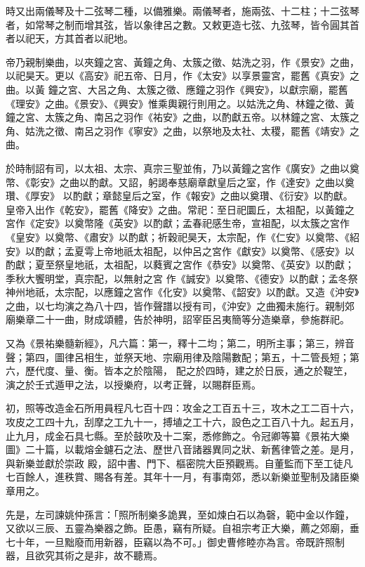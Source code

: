 \begin{pinyinscope}
 時又出兩儀琴及十二弦琴二種，以備雅樂。兩儀琴者，施兩弦、十二柱；十二弦琴者，如常琴之制而增其弦，皆以象律呂之數。又敕更造七弦、九弦琴，皆令圓其首者以祀天，方其首者以祀地。



 帝乃親制樂曲，以夾鐘之宮、黃鐘之角、太簇之徵、姑洗之羽，作《景安》之曲，以祀昊天。更以《高安》祀五帝、日月，作《太安》以享景靈宮，罷舊《真安》之曲。以黃
 鐘之宮、大呂之角、太簇之徵、應鐘之羽作《興安》，以獻宗廟，罷舊《理安》之曲。《景安》、《興安》惟乘輿親行則用之。以姑洗之角、林鐘之徵、黃鐘之宮、太簇之角、南呂之羽作《祐安》之曲，以酌獻五帝。以林鐘之宮、太簇之角、姑洗之徵、南呂之羽作《寧安》之曲，以祭地及太社、太稷，罷舊《靖安》之曲。



 於時制詔有司，以太祖、太宗、真宗三聖並侑，乃以黃鐘之宮作《廣安》之曲以奠幣、《彰安》之曲以酌獻。又詔，躬謁奉慈廟章獻皇后之室，作《達安》之曲以奠瓚、《厚安》
 以酌獻；章懿皇后之室，作《報安》之曲以奠瓚、《衍安》以酌獻。皇帝入出作《乾安》，罷舊《降安》之曲。常祀：至日祀圜丘，太祖配，以黃鐘之宮作《定安》以奠幣隆《英安》以酌獻；孟春祀感生帝，宣祖配，以太簇之宮作《皇安》以奠幣、《肅安》以酌獻；祈穀祀昊天，太宗配，作《仁安》以奠幣、《紹安》以酌獻；孟夏雩上帝地祇太祖配，以仲呂之宮作《獻安》以奠幣、《感安》以酌獻；夏至祭皇地祇，太祖配，以蕤賓之宮作《恭安》以奠幣、《英安》以酌獻；季秋大饗明堂，真宗配，以無射之宮
 作《誠安》以奠幣、《德安》以酌獻；孟冬祭神州地祇，太宗配，以應鐘之宮作《化安》以奠幣、《韶安》以酌獻。又造《沖安》之曲，以七均演之為八十四，皆作聲譜以授有司，《沖安》之曲獨未施行。親制郊廟樂章二十一曲，財成頌體，告於神明，詔宰臣呂夷簡等分造樂章，參施群祀。



 又為《景祐樂髓新經》，凡六篇：第一，釋十二均；第二，明所主事；第三，辨音聲；第四，圖律呂相生，並祭天地、宗廟用律及陰陽數配；第五，十二管長短；第六，歷代度、量、衡。皆本之於陰陽，
 配之於四時，建之於日辰，通之於鞮笁，演之於壬式遁甲之法，以授樂府，以考正聲，以賜群臣焉。



 初，照等改造金石所用員程凡七百十四：攻金之工百五十三，攻木之工二百十六，攻皮之工四十九，刮摩之工九十一，搏埴之工十六，設色之工百八十九。起五月，止九月，成金石具七縣。至於鼓吹及十二案，悉修飾之。令冠卿等纂《景祐大樂圖》二十篇，以載熔金鑢石之法、歷世八音諸器異同之狀、新舊律管之差。是月，與新樂並獻於崇政
 殿，詔中書、門下、樞密院大臣預觀焉。自董監而下至工徒凡七百餘人，進秩賞、賜各有差。其年十一月，有事南郊，悉以新樂並聖制及諸臣樂章用之。



 先是，左司諫姚仲孫言：「照所制樂多詭異，至如煉白石以為磬，範中金以作鐘，又欲以三辰、五靈為樂器之飾。臣愚，竊有所疑。自祖宗考正大樂，薦之郊廟，垂七十年，一旦黜廢而用新器，臣竊以為不可。」御史曹修睦亦為言。帝既許照制器，且欲究其術之是非，故不聽焉。



\end{pinyinscope}